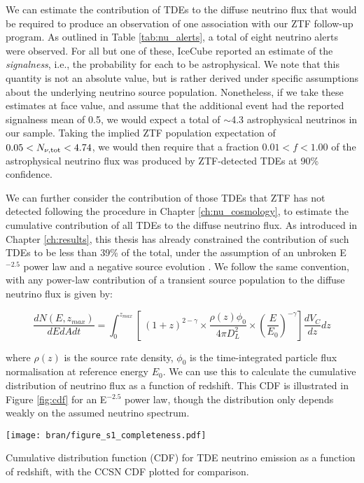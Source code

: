 We can estimate the contribution of TDEs to the diffuse neutrino flux that would be required to produce an observation of one association with our ZTF follow-up program. As outlined in Table \ref{tab:nu_alerts}, a total of eight neutrino alerts were observed. For all but one of these, IceCube reported an estimate of the \emph{signalness}, i.e., the probability for each to be astrophysical. We note that this quantity is not an absolute value, but is rather derived under specific assumptions about the underlying neutrino source population. Nonetheless, if we take these estimates at face value, and assume that the additional event had the reported signalness mean of 0.5, we would expect a total of $\sim$4.3 astrophysical neutrinos in our sample. Taking the implied ZTF population expectation of $0.05 < N_{\nu, \textup{tot}} < 4.74$, we would then require that a fraction $0.01 < f < 1.00$ of the astrophysical neutrino flux was produced by ZTF-detected TDEs at 90\% confidence.

We can further consider the contribution of those TDEs that ZTF has not detected following the procedure in Chapter \ref{ch:nu_cosmology}, to  estimate the cumulative contribution of all TDEs to the diffuse neutrino flux. As introduced in Chapter \ref{ch:results}, this thesis has already constrained the contribution of such TDEs to be less than 39\% of the total, under the assumption of an unbroken E$^{-2.5}$ power law and a negative source evolution \cite{2019ICRC...36.1016S, Sun:2015bda}. We follow the same convention, with any power-law contribution of a transient source population to the diffuse neutrino flux is given by:

\begin{equation}
\frac{dN(E, z_{max})}{dEdAdt} = \int_{0}^{z_{max}} \left[ \ (1+z)^{2 - \gamma} \times \frac{\rho(z)\phi_{0}}{4 \pi D_{L}^{2}} \times \left( \frac{E}{E_{0}}\right) ^{-\gamma}  \right] \frac{dV_{C}}{dz} dz
\label{eq:nu_flux_tot}
\end{equation}

where $\rho(z)$ is the source rate density, $\phi_{0}$ is the time-integrated particle flux normalisation at reference energy $E_{0}$. We can use this to calculate the cumulative distribution of neutrino flux as a function of redshift\cite{flarestack}. This CDF is illustrated in Figure \ref{fig:cdf} for an E$^{-2.5}$ power law, though the distribution only depends weakly on the assumed neutrino spectrum.

\begin{marginfigure}
	\centering \texttt{[image: bran/figure\_s1\_completeness.pdf]}
	\caption{Cumulative distribution function (CDF) for TDE neutrino emission as a function of redshift, with the CCSN CDF plotted for comparison.}
	\label{fig:cdf}
\end{marginfigure}

